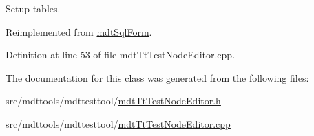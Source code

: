 Setup tables. 



Reimplemented from \hyperlink{classmdt_sql_form_a27fe6e45aa5d4d7782aad9833e6de20b}{mdt\-Sql\-Form}.



Definition at line 53 of file mdt\-Tt\-Test\-Node\-Editor.\-cpp.



The documentation for this class was generated from the following files\-:\begin{DoxyCompactItemize}
\item 
src/mdttools/mdttesttool/\hyperlink{mdt_tt_test_node_editor_8h}{mdt\-Tt\-Test\-Node\-Editor.\-h}\item 
src/mdttools/mdttesttool/\hyperlink{mdt_tt_test_node_editor_8cpp}{mdt\-Tt\-Test\-Node\-Editor.\-cpp}\end{DoxyCompactItemize}
